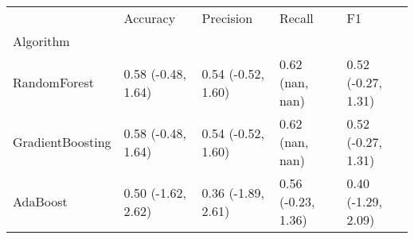 \begin{tabular}{lllll}
\toprule
{} &            Accuracy &           Precision &              Recall &                  F1 \\
Algorithm        &                     &                     &                     &                     \\
\midrule
RandomForest     &  0.58 (-0.48, 1.64) &  0.54 (-0.52, 1.60) &     0.62 (nan, nan) &  0.52 (-0.27, 1.31) \\
GradientBoosting &  0.58 (-0.48, 1.64) &  0.54 (-0.52, 1.60) &     0.62 (nan, nan) &  0.52 (-0.27, 1.31) \\
AdaBoost         &  0.50 (-1.62, 2.62) &  0.36 (-1.89, 2.61) &  0.56 (-0.23, 1.36) &  0.40 (-1.29, 2.09) \\
\bottomrule
\end{tabular}
